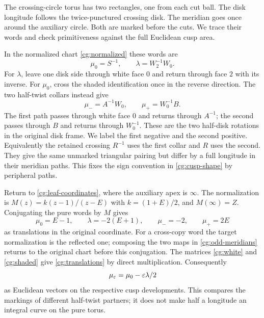 The crossing-circle torus has two rectangles, one from each cut
ball. The disk longitude follows the twice-punctured crossing disk.
The meridian goes once around the auxiliary circle. Both are
marked before the cuts. We trace their words and check
primitiveness against the full Euclidean cusp area.

In the normalized chart \eqref{cg:normalized} these words are
\begin{equation}\label{cg:peripheral-words}
 \mu_0=S^{-1},\qquad \lambda=W_2^{-1}W_0 .
\end{equation}
For $\lambda$, leave one disk side through white face $0$ and
return through face $2$ with its inverse. For $\mu_0$, cross
the shaded identification once in the reverse direction.
The two half-twist collars instead give
\begin{equation}\label{cg:odd-meridians}
 \mu_-=A^{-1}W_0,\qquad \mu_+=W_0^{-1}B .
\end{equation}
The first path passes through white face $0$ and returns through
$A^{-1}$; the second passes through $B$ and returns through
$W_0^{-1}$. These are the two half-disk rotations in the original
disk frame. We label the first negative and the second positive.
Equivalently the retained crossing $R^{-1}$ uses the first collar
and $R$ uses the second. They give the same unmarked triangular
pairing but differ by a full longitude in their meridian paths.
This fixes the sign convention in \eqref{cg:cusp-shape} by
peripheral paths.

Return to \eqref{cg:leaf-coordinates}, where the auxiliary apex
is $\infty$. The normalization is
$M(z)=k(z-1)/(z-E)$ with $k=(1+E)/2$, and $M(\infty)=Z$.
Conjugating the pure words by $M$ gives
\begin{equation}\label{cg:translations}
 \mu_0=E-1,\qquad \lambda=-2(E+1),\qquad
 \mu_-=-2,\qquad \mu_+=2E
\end{equation}
as translations in the original coordinate. For a cross-copy
word the target normalization is the reflected one; composing
the two maps in \eqref{cg:odd-meridians} returns to the original
chart before this conjugation. The matrices
\eqref{cg:white} and \eqref{cg:shaded} give
\eqref{cg:translations} by direct multiplication.
Consequently
\begin{equation}\label{cg:half-shear}
 \mu_\varepsilon=\mu_0-\varepsilon\lambda/2
\end{equation}
as Euclidean vectors on the respective cusp developments.
This compares the markings of different half-twist partners;
it does not make half a longitude an integral curve on the pure
torus.

